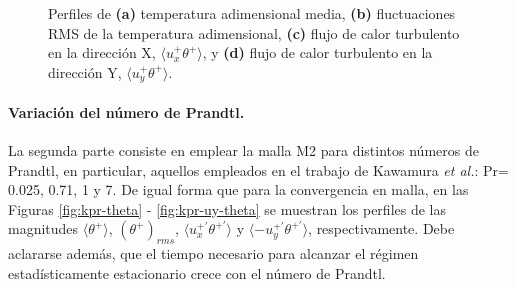 \begin{figure}[H]
 \caption{Perfiles de \textbf{(a)} temperatura adimensional media, \textbf{(b)} fluctuaciones RMS de la temperatura adimensional, \textbf{(c)} flujo de calor turbulento en la dirección X, $\langle u^+_x \theta^+ \rangle$, y \textbf{(d)} flujo de calor turbulento en la dirección Y, $\langle u^+_y \theta^+ \rangle$.} 
 \label{fig:kmesh_1}
\end{figure}

\paragraph{Variación del número de Prandtl.}
La segunda parte consiste en emplear la malla M2 para distintos números de Prandtl, en particular, aquellos empleados en el trabajo de Kawamura \textit{et al.}: Pr= 0.025, 0.71, 1 y 7. De igual forma que para la convergencia en malla, en las Figuras \ref{fig:kpr-theta} - \ref{fig:kpr-uy-theta} se muestran los perfiles de las magnitudes $\langle \theta^+ \rangle$, $(\theta^+)_{rms}$, $\langle u^{+ \prime}_x \theta^{+ \prime} \rangle$ y $\langle - u^{+ \prime}_y \theta^{+ \prime} \rangle$, respectivamente. Debe aclararse además, que el tiempo necesario para alcanzar el régimen estadísticamente estacionario crece con el número de Prandtl.

